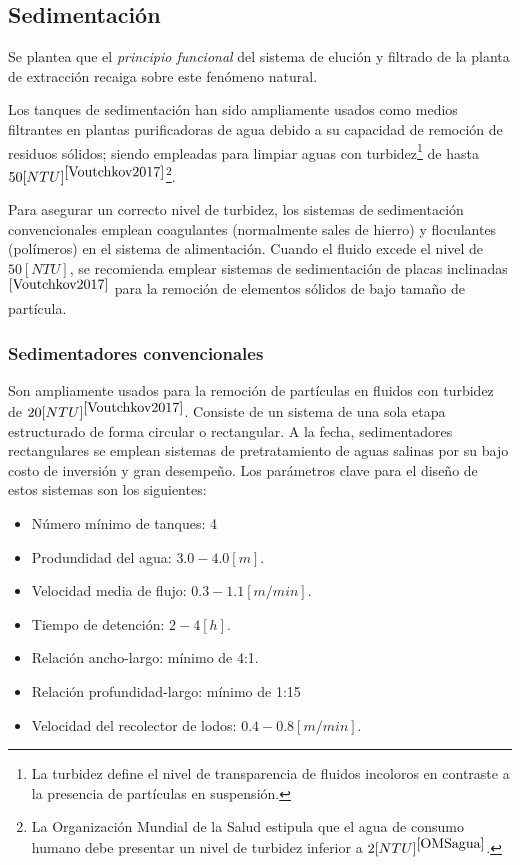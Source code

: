 \subsection{Sedimentaci\'on}

\noindent
\justify

Se plantea que el \textit{principio funcional} del sistema de eluci\'on y filtrado de la planta de extracci\'on recaiga sobre este fen\'omeno natural.

\noindent
\justify

Los tanques de sedimentaci\'on han sido ampliamente usados como medios filtrantes en plantas purificadoras de agua debido a su capacidad de remoci\'on de residuos s\'olidos; siendo empleadas para limpiar aguas con turbidez\footnote{La turbidez define el nivel de transparencia de fluidos incoloros en contraste a la presencia de part\'iculas en suspensi\'on.} de hasta $50 [NTU]^{\cite{Voutchkov2017}}$\footnote{La Organizaci\'on Mundial de la Salud estipula que el agua de consumo humano debe presentar un nivel de turbidez inferior a $2 [NTU]^{\cite{OMSagua}}$.}. 

\noindent
\justify

Para asegurar un correcto nivel de turbidez, los sistemas de sedimentaci\'on convencionales emplean coagulantes (normalmente sales de hierro) y floculantes (pol\'imeros) en el sistema de alimentaci\'on. Cuando el fluido excede el nivel de $50 [NTU]$, se recomienda emplear sistemas de sedimentaci\'on de placas inclinadas$^{\cite{Voutchkov2017}}$ para la remoci\'on de elementos s\'olidos de bajo tama\~no de part\'icula.


\subsubsection{Sedimentadores convencionales}

\noindent
\justify

Son ampliamente usados para la remoci\'on de part\'iculas en fluidos con turbidez de $20 [NTU]^{\cite{Voutchkov2017}}$. Consiste de un sistema de una sola etapa estructurado de forma circular o rectangular. A la fecha, sedimentadores rectangulares se emplean sistemas de pretratamiento de aguas salinas por su bajo costo de inversi\'on y gran desempe\~no. Los par\'ametros clave para el dise\~no de estos sistemas son los siguientes:

\begin{itemize}
	\item N\'umero m\'inimo de tanques: 4
	\item Produndidad del agua: $3.0 - 4.0 [m]$.
	\item Velocidad media de flujo: $0.3 - 1.1 [m/min]$.
	\item Tiempo de detenci\'on: $2 - 4 [h]$.
	\item Relaci\'on ancho-largo: m\'inimo de 4:1.
	\item Relaci\'on profundidad-largo: m\'inimo de 1:15 
	\item Velocidad del recolector de lodos: $0.4 - 0.8 [m/min]$.
\end{itemize}

